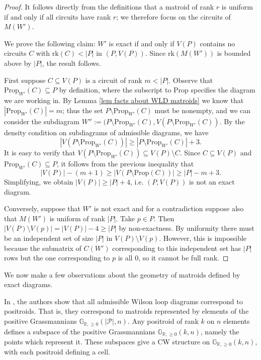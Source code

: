 \documentclass[11pt]{article}
\newcommand{\hlfix}[2]{\texthl{#1}\todo{#2}}
\newcommand{\R}{\mathbb{R}}
\newcommand{\Gr}{\mathbb{G}_{\R, \geq 0}}
\newcommand{\rk}{\textrm{rk} }
\newcommand{\cP}{\mathcal{P}}
\newcommand{\Prop}{\textrm{Prop}}
\theoremstyle{remark}
\theoremstyle{definition}
\begin{document}
\begin{proof}
It follows directly from the definitions that a matroid of rank $r$ is uniform if and only if all circuits have rank $r$; we therefore focus on the circuits of $M(W')$.

We prove the following claim: $W'$ is exact if and only if $V(P)$ contains no circuits $C$ with $\rk (C)< |P|$ in $(P, V(P))$. Since $\rk(M(W'))$ is bounded above by $|P|$, the result follows.

First suppose $C \subseteq V(P)$ is a circuit of rank $m < |P|$. Observe that $\Prop_{W'}(C)\subseteq P$ by definition, where the subscript to $\Prop$ specifies the diagram we are working in. By Lemma \ref{lem facts about WLD matroids} we know that ${|\Prop_{W'}(C)| = m}$; thus the set $P \setminus \Prop_{W'}(C)$ must be nonempty, and we can consider the subdiagram $W'':= (P\setminus \Prop_{W'}(C),V(P\setminus\Prop_{W'}(C))$. By the density condition on subdiagrams of admissible diagrams, we have
\[|V(P\setminus\Prop_{W'}(C))| \geq |P\setminus\Prop_{W'}(C)| + 3.\]
It is easy to verify that $V(P\setminus\Prop_{W'}(C)) \subseteq V(P)\setminus C$. Since $C \subseteq V(P)$ and $\Prop_{W'}(C) \subseteq P$, it follows from the previous inequality that
\[|V(P)| - (m+1) \geq |V(P\setminus\Prop(C))| \geq |P| - m + 3.\]
Simplifying, we obtain $|V(P)| \geq |P| + 4$, i.e. $(P,V(P))$ is not an exact diagram.

Conversely, suppose that $W'$ is not exact and for a contradiction suppose also that $M(W')$ is uniform of rank $|P|$.  Take $p \in P$.  Then $|V(P)\setminus V(p)| = |V(P)| - 4 \geq |P|$ by non-exactness.  By uniformity there must be an independent set of size $|P|$ in $V(P)\setminus V(p)$.  However, this is impossible because the submatrix of $C(W')$ corresponding to this independent set has $|P|$ rows but the one corresponding to $p$ is all $0$, so it cannot be full rank.
\end{proof}

We now make a few observations about the geometry of matroids defined by exact diagrams.

In \cite{wilsonloop}, the authors show that all admissible Wilson loop diagrams correspond to positroids. That is, they correspond to matroids represented by elements of the positive Grassmannians $\Gr(|\cP|, n)$. Any positroid of rank $k$ on $n$ elements defines a subspace of the positive Grassmannians $\Gr(k, n)$, namely the points which represent it. These subspaces give a CW structure on $\Gr(k,n)$, with each positroid defining a cell. 
\end{document}
